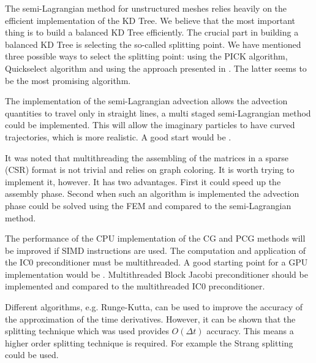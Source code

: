 The semi-Lagrangian method for unstructured meshes relies heavily on the efficient implementation of the KD Tree. We believe that the most important thing is to build a balanced KD Tree efficiently. The crucial part in building a balanced KD Tree is selecting the so-called splitting point. We have mentioned three possible ways to select the splitting point: using the PICK algorithm, Quickselect algorithm and using the approach presented in \cite{Balanced-KD-Tree}. The latter seems to be the most promising algorithm.

The implementation of the semi-Lagrangian advection allows the advection quantities to travel only in straight lines, a multi staged semi-Lagrangian method could be implemented. This will allow the imaginary particles to have curved trajectories, which is more realistic. A good start would be \cite{Fract-Seim-Lag}.

It was noted that multithreading the assembling of the matrices in a sparse (CSR) format is not trivial and relies on graph coloring. It is worth trying to implement it, however. It has two advantages. First it could speed up the assembly phase. Second when such an algorithm is implemented the advection phase could be solved using the FEM and compared to the semi-Lagrangian method.

The performance of the CPU implementation of the CG and PCG methods will be improved if SIMD instructions are used. The computation and application of the IC0 preconditioner must be multithreaded. A good starting point for a GPU implementation would be \cite{MT-PCG-NV}. Multithreaded Block Jacobi preconditioner should be implemented and compared to the multithreaded IC0 preconditioner.

Different algorithms, e.g. Runge-Kutta, can be used to improve the accuracy of the approximation of the time derivatives. However, it can be shown \cite{Bridson} that the splitting technique which was used provides $O(\Delta t)$ accuracy. This means a higher order splitting technique is required. For example the Strang splitting could be used.

